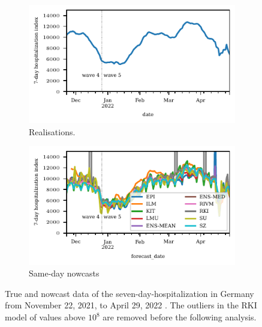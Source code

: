 \begin{figure}
    \centering
    \begin{subfigure}[t]{0.48\textwidth}
    \includegraphics{plots/covid_nowcast/00_true_data.pdf}
    \caption{Realisations.}
    \label{fig:app-covid-true}
    \end{subfigure}\hfill
    \begin{subfigure}[t]{0.48\textwidth}
    \includegraphics{plots/covid_nowcast/00_nowcast_data.pdf}
    \caption{Same-day nowcasts}
    \label{fig:app-covid-nowcast}
        \end{subfigure}
    \caption{True and nowcast data of the seven-day-hospitalization in Germany from November 22, 2021, to April 29, 2022 \parencite{ChairOfEconometricsAndStatisticsAtKarlsruheInstituteOfTechnology2024}.
    The outliers in the RKI model of values above $10^8$ are removed before the following analysis.}
    \label{fig:app-covid-true-nowcast}
\end{figure}


